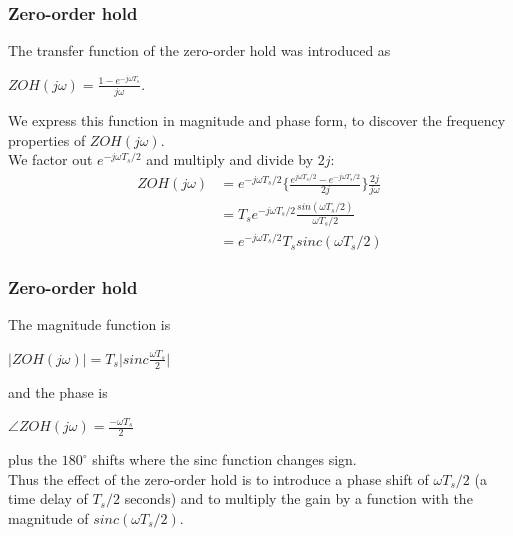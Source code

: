 \begin{frame}
	\frametitle{Zero-order hold}
	The transfer function of the zero-order hold was introduced as\\
	\vspace{-1ex}
	\begin{center}
		$ZOH(j\omega)=\frac{1-e^{-j\omega T_s}}{j\omega}$.\\
	\end{center}
	\vspace{-1ex}
	We express this function in magnitude and phase form, to discover the frequency properties of $ZOH(j\omega)$.\\
	\medskip
	We factor out $e^{-j\omega T_s/2}$ and multiply and divide by $2j$:\\
	\vspace{-4ex}
	\begin{equation}
	\begin{split}
		ZOH(j\omega) &= e^{-j\omega T_s/2}\Big\{\frac{e^{j\omega T_s/2}-e^{-j\omega T_s/2}}{2j}\Big\} \frac{2j}{j\omega}\\
		& = T_se^{-j\omega T_s/2} \frac{sin(\omega T_s/2)}{\omega T_s/2}\\
		& = e^{-j\omega T_s/2} T_s sinc(\omega T_s/2)
	\end{split} \nonumber
	\end{equation}
	\vspace{-1ex}
\end{frame}

\begin{frame}
	\frametitle{Zero-order hold}
	The magnitude function is\\
	\vspace{-1ex}
	\begin{center}
		$|ZOH(j\omega)| = T_s\Big|sinc\frac{\omega T_s}{2} \Big|$
	\end{center}
	\vspace{-1ex}
	and the phase is\\
	\vspace{-1ex}
	\begin{center}
		$\angle ZOH(j\omega)=\frac{-\omega T_s}{2}$
	\end{center}
	\vspace{-1ex}
	plus the $180^\circ$ shifts where the sinc function changes sign.\\
	\vspace{1em}
	Thus the effect of the zero-order hold is to introduce a phase shift of $\omega T_s/2$ (a time delay of $T_s/2$ seconds) and to multiply the gain by a function with the magnitude of $sinc(\omega T_s/2)$.
\end{frame}


